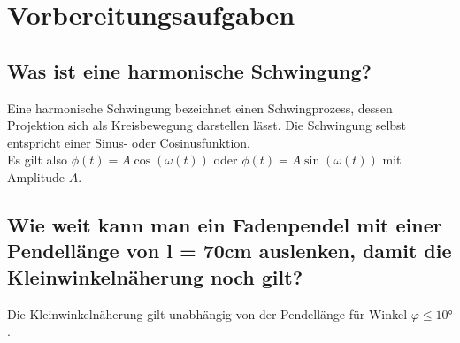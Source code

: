 \section{Vorbereitungsaufgaben}
\subsection{Was ist eine harmonische Schwingung?}
Eine harmonische Schwingung bezeichnet einen Schwingprozess, dessen Projektion sich als Kreisbewegung darstellen lässt. Die Schwingung selbst entspricht einer Sinus- oder Cosinusfunktion. \\

\noindent Es gilt also $\phi(t)=A\cos(\omega(t))$ oder $\phi(t)= A\sin(\omega(t))$ mit Amplitude $A$.
\subsection{Wie weit kann man ein Fadenpendel mit einer Pendellänge von l = 70cm auslenken, damit die Kleinwinkelnäherung noch gilt?}
Die Kleinwinkelnäherung gilt unabhängig von der Pendellänge für Winkel $φ\leq10°$.
\label{sec:Vorbereitungsaufgaben}